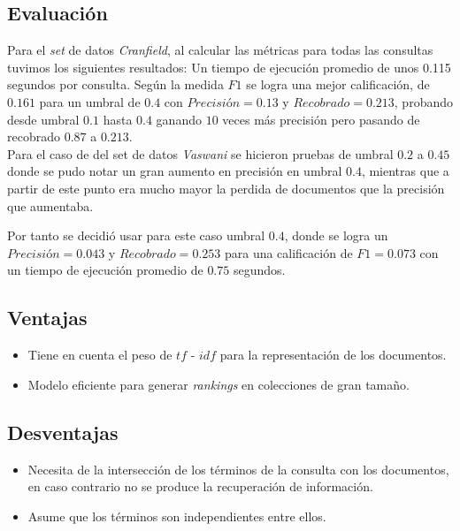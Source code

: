 \documentclass[spanish]{article}
\begin{document}
			\subsection*{Evaluación}

				Para el \emph{set} de datos \emph{Cranfield}, al calcular las métricas para todas las consultas tuvimos los siguientes resultados: 
				Un tiempo de ejecución promedio de unos 0.115 segundos por consulta. 
				Según la medida $F1$ se logra una mejor calificación, de $0.161$ para un umbral de $0.4$ con $Precisión= 0.13$ y $Recobrado= 0.213$, probando desde umbral $0.1$ hasta $0.4$ 
				ganando $10$ veces más precisión pero pasando de recobrado $0.87$ a $0.213$.\\

				Para el caso de del set de datos \emph{Vaswani} se hicieron pruebas de umbral $0.2$ a $0.45$ donde se pudo notar un gran aumento en precisión en umbral $0.4$, mientras que a partir de este punto era mucho mayor la perdida de documentos que la precisión que aumentaba.

				Por tanto se decidió usar para este caso umbral $0.4$, donde se logra un $Precisión= 0.043$ y $Recobrado=0.253$ para una calificación de $F1= 0.073$ con un tiempo de ejecución promedio de $0.75$ segundos.

			\subsection*{Ventajas}
				
				\begin{itemize}
					\item Tiene en cuenta el peso de $tf$ - $idf$ para la representación de los documentos.
					\item Modelo eficiente para generar \emph{rankings} en colecciones de gran tamaño.
				\end{itemize}	


			\subsection*{Desventajas}

			\begin{itemize}
				\item Necesita de la intersección de los términos de la consulta con los documentos, en caso contrario no se produce la recuperación de información.
				\item Asume que los términos son independientes entre ellos.
			\end{itemize}
\end{document}
